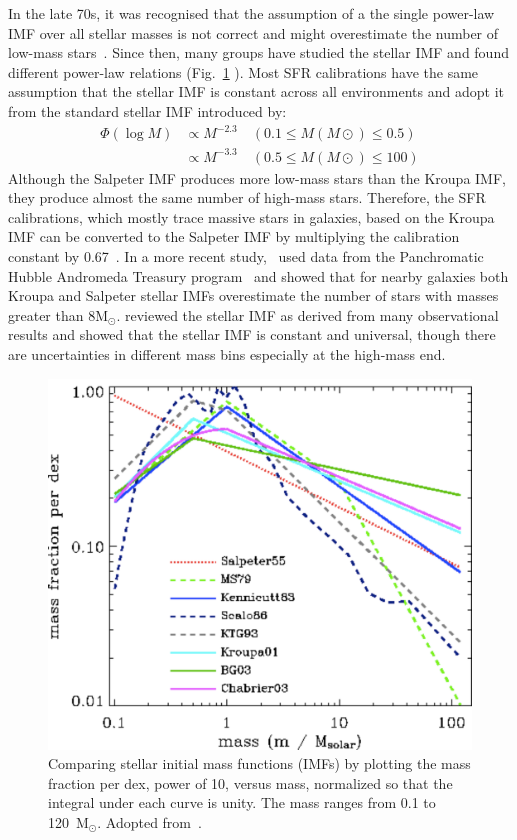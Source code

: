 In the late 70s, it was recognised that the assumption of a the single power-law IMF over all stellar masses is not correct and might overestimate the number of low-mass stars~\citep{Kroupa93, Bastin10}. 
Since then, many groups have studied the stellar IMF and found different power-law relations (Fig.~\ref{fig: imf} ). 
Most SFR calibrations have the same assumption that the stellar IMF is constant across all environments and adopt it from the standard stellar IMF introduced by\cite{Kroupa01}:
\begin{equation}
\begin{split}
    \Phi (\log M) & \propto M^{-2.3}    \quad    (0.1 \le M(M{\odot}) \le 0.5)\\                  
           & \propto M^{-3.3}    \quad    (0.5 \le M(M{\odot}) \le 100)
\end{split}
\end{equation}
Although the Salpeter IMF produces more low-mass stars than the Kroupa IMF, they produce almost the same number of high-mass stars. 
Therefore, the SFR calibrations, which mostly trace massive stars in galaxies, based on the Kroupa IMF can be converted to the Salpeter IMF by multiplying the calibration constant by 0.67~\citep{Madau14}.
In a more recent study,~\cite{Weisz15} used data from the Panchromatic Hubble Andromeda Treasury program~\citep[PHAT][]{Dalcanton12} and showed that for nearby galaxies both Kroupa and Salpeter stellar IMFs overestimate the number of stars with masses greater than 8M$_\odot$.
\cite{Bastin10} reviewed the stellar IMF as derived from many observational results and showed that the stellar IMF is constant and universal, though there are uncertainties in different mass bins especially at the high-mass end. 

\begin{figure}
\label{fig: imf}
\centering
\includegraphics[width=16cm]{../image_intro/imf}
\small
\caption{Comparing stellar initial mass functions (IMFs) by plotting the mass fraction per dex, power of 10, versus mass, normalized so that the integral under each curve is unity. The mass ranges from 0.1 to 120~M$_\odot$. Adopted from~\cite{Baldry03}.} 
\end{figure}



